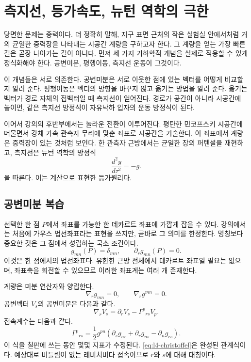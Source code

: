 \chapter{측지선, 등가속도, 뉴턴 역학의 극한}

당면한 문제는 중력이다. 더 정확히 말해, 지구 표면 근처의 작은 실험실 안에서처럼 거의 균일한 중력장을 나타내는 시공간 계량을 구하고자 한다. 그 계량을 얻는 가장 빠른 길은 곧장 나아가는 길이 아니다. 먼저 세 가지 기하학적 개념을 실제로 적용할 수 있게 정식화해야 한다. 공변미분, 평행이동, 측지선 운동이 그것이다.

이 개념들은 서로 의존한다. 공변미분은 서로 이웃한 점에 있는 벡터를 어떻게 비교할지 알려 준다. 평행이동은 벡터의 방향을 바꾸지 않고 옮기는 방법을 알려 준다. 옮기는 벡터가 경로 자체의 접벡터일 때 측지선이 얻어진다. 경로가 공간이 아니라 시공간에 놓이면, 같은 측지선 방정식이 자유낙하 입자의 운동 방정식이 된다.

이어서 강의의 후반부에서는 놀라운 전환이 이루어진다. 평탄한 민코프스키 시공간에 머물면서 강체 가속 관측자 무리에 맞춘 좌표로 시공간을 기술한다. 이 좌표에서 계량은 중력장이 있는 것처럼 보인다. 한 관측자 근방에서는 균일한 장의 퍼텐셜을 재현하고, 측지선은 뉴턴 역학의 방정식
\begin{equation}
\frac{d^2y}{d\tau^2}=-g.
\end{equation}
을 따른다. 이는 계산으로 표현한 등가원리다.

\section{공변미분 복습}

선택한 한 점 \(P\)에서 좌표를 가능한 한 데카르트 좌표에 가깝게 잡을 수 있다. 강의에서는 처음에 가우스 법선좌표라는 표현을 쓰지만, 곧바로 그 의미를 한정한다. 명칭보다 중요한 것은 그 점에서 성립하는 국소 조건이다.
\begin{equation}
g_{mn}(P)=\delta_{mn},
\qquad
\partial_r g_{mn}(P)=0.
\label{eq:l4-normal-point}
\end{equation}
이것은 한 점에서의 법선좌표다. 유한한 근방 전체에서 데카르트 좌표일 필요는 없으며, 좌표축을 회전할 수 있으므로 이러한 좌표계는 여러 개 존재한다.

계량은 미분 연산자와 양립한다.
\begin{equation}
\nabla_r g_{mn}=0,
\qquad
\nabla_r g^{mn}=0.
\label{eq:l4-metric-compatibility}
\end{equation}
공변벡터 \(V_s\)의 공변미분은 다음과 같다.
\begin{equation}
\nabla_r V_s
=
\partial_r V_s-\Gamma^p{}_{rs}V_p.
\label{eq:l4-covector-derivative}
\end{equation}
접속계수는 다음과 같다.
\begin{equation}
\Gamma^p{}_{rs}
=
\frac{1}{2}g^{pn}
\left(
\partial_s g_{nr}
+\partial_r g_{ns}
-\partial_n g_{rs}
\right).
\label{eq:l4-christoffel}
\end{equation}
이 식을 칠판에 쓰는 동안 몇몇 지표가 수정된다. \eqref{eq:l4-christoffel}은 완성된 관계식이다. 예상대로 비틀림이 없는 레비치비타 접속이므로 \(r\)와 \(s\)에 대해 대칭이다.

